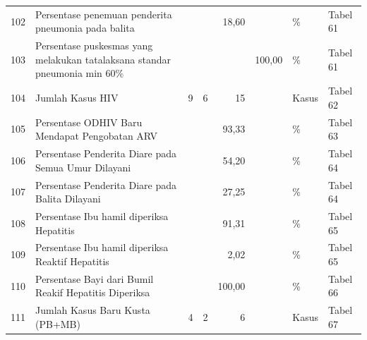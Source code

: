 \begin{small}
\begin{longtable}{rY{12em}rrrrY{5em}Y{5em}}
	                  102 & Persentase penemuan penderita pneumonia pada balita                                                     &        &        &   18,60 &                    & \%                             & Tabel 61 \\
	103 & Persentase puskesmas yang melakukan tatalaksana standar pneumonia min 60\%                              &        &        &         &             100,00 & \%                             & Tabel 61 \\
	                  104 & Jumlah Kasus HIV                                                                                        &      9 &      6 &      15 &                    & Kasus                          & Tabel 62 \\
	105 & Persentase ODHIV Baru Mendapat Pengobatan ARV                                                           &        &        &   93,33 &                    & \%                             & Tabel 63 \\
	                  106 & Persentase Penderita Diare pada Semua Umur Dilayani                                                     &        &        &   54,20 &                    & \%                             & Tabel 64 \\
	107 & Persentase Penderita Diare pada Balita Dilayani                                                         &        &        &   27,25 &                    & \%                             & Tabel 64 \\
	                  108 & Persentase Ibu hamil diperiksa Hepatitis                                                                &        &        &   91,31 &                    & \%                             & Tabel 65 \\
	109 & Persentase Ibu hamil diperiksa Reaktif Hepatitis                                                        &        &        &    2,02 &                    & \%                             & Tabel 65 \\
	                  110 & Persentase Bayi dari Bumil Reakif Hepatitis Diperiksa                                                   &        &        &  100,00 &                    & \%                             & Tabel 66 \\
	111 & Jumlah Kasus Baru Kusta (PB+MB)                                                                         &      4 &      2 &       6 &                    & Kasus                          & Tabel 67 \\

\end{longtable}
\end{small}
